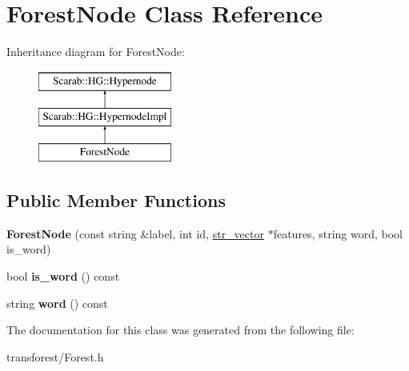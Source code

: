 \hypertarget{classForestNode}{
\section{ForestNode Class Reference}
\label{classForestNode}
}
Inheritance diagram for ForestNode:\begin{figure}[H]
\begin{center}
\leavevmode
\includegraphics[height=3cm]{classForestNode}
\end{center}
\end{figure}
\subsection*{Public Member Functions}
\begin{DoxyCompactItemize}
\item 
\hypertarget{classForestNode_aeeb649eef15a82d283ae728b0a44d183}{
{\bfseries ForestNode} (const string \&label, int id, \hyperlink{classsvector}{str\_\-vector} $\ast$features, string word, bool is\_\-word)}
\label{classForestNode_aeeb649eef15a82d283ae728b0a44d183}

\item 
\hypertarget{classForestNode_ab44af8003df7af0ce93b9b904301fb92}{
bool {\bfseries is\_\-word} () const }
\label{classForestNode_ab44af8003df7af0ce93b9b904301fb92}

\item 
\hypertarget{classForestNode_a18c00f9aae93bc963358e488f2cce308}{
string {\bfseries word} () const }
\label{classForestNode_a18c00f9aae93bc963358e488f2cce308}

\end{DoxyCompactItemize}


The documentation for this class was generated from the following file:\begin{DoxyCompactItemize}
\item 
transforest/Forest.h\end{DoxyCompactItemize}

